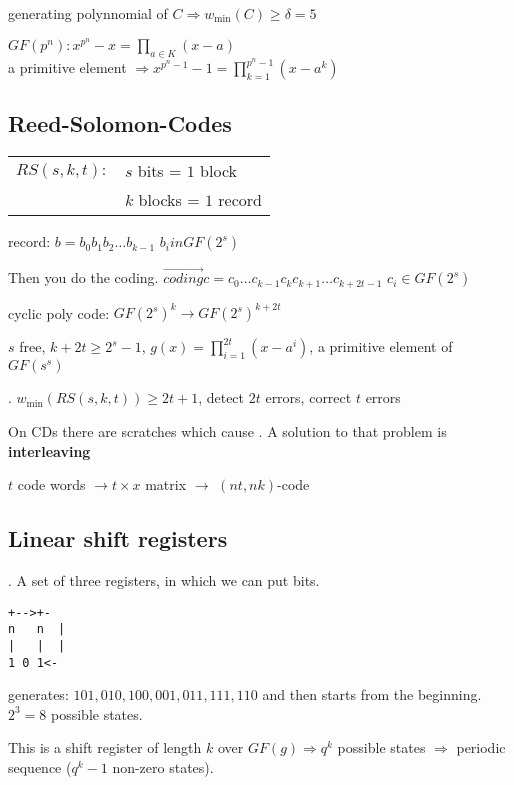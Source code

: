 generating polynnomial of $C \Rightarrow w_{\min}(C) \geq \delta = 5$

$GF(p^n): x^{p^n} -x = \prod_{a \in K}(x-a)$ \\
a primitive element $\Rightarrow x^{p^n-1}-1 = \prod_{k=1}^{p^n-1}(x-a^k)$

\subsection{Reed-Solomon-Codes}

\begin{tabular}{ll}
  $RS(s,k,t):$ &$s$ bits = $1$ block\\
    & $k$ blocks = $1$ record\\
\end{tabular}

record: $b= b_0b_1b_2 \ldots b_{k-1}$ \quad $b_i in GF(2^s)$

Then you do the coding. $\stackrel{\to}{coding} c= c_0\ldots c_{k-1}c_{k}c_{k+1}\ldots c_{k+2t-1}$ \quad $c_i \in GF(2^s)$

cyclic poly code: $GF(2^s)^k \to GF(2^s)^{k+2t}$

$s$ free, $k+2t \geq 2^s-1$, $g(x) = \prod_{i=1}^{2t} (x-a^i)$, a primitive element of $GF(s^s)$

\Theorem.
$w_{\min}(RS(s,k,t)) \geq 2t+1$, detect $2t$ errors, correct $t$ errors

On CDs there are scratches which cause . A solution to that problem is \textbf{interleaving}

$t$ code words $\to t \times x$ matrix $\to$ $(nt,nk)$-code

\subsection{Linear shift registers}
\Example.
A set of three registers, in which we can put bits. 


\begin{verbatim}
+-->+-
n   n  |
|   |  |
1 0 1<-
\end{verbatim}

generates: $101,010,100,001,011,111,110$ and then starts from the beginning. $2^3=8$ possible states.


This is a shift register of length $k$ over $GF(g) \Rightarrow q^k$ possible states $\Rightarrow$ periodic sequence ($q^k -1$ non-zero states).

